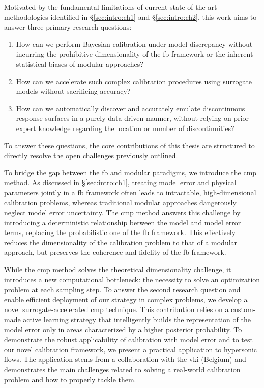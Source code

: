 Motivated by the fundamental limitations of current state-of-the-art methodologies identified in \S\ref{sec:intro:ch1} and \S\ref{sec:intro:ch2}, this work aims to answer three primary research questions:

\begin{enumerate}
  \item How can we perform Bayesian calibration under model discrepancy without incurring the prohibitive dimensionality of the \gls{fb} framework or the inherent statistical biases of modular approaches?
  \item How can we accelerate such complex calibration procedures using surrogate models without sacrificing accuracy?
  \item How can we automatically discover and accurately emulate discontinuous response surfaces in a purely data-driven manner, without relying on prior expert knowledge regarding the location or number of discontinuities?
\end{enumerate}

\smallskip
To answer these questions, the core contributions of this thesis are structured to directly resolve the open challenges previously outlined.

\smallskip
To bridge the gap between the \gls{fb} and modular paradigms, we introduce the \gls{cmp} method. As discussed in \S\ref{sec:intro:ch1}, treating model error and physical parameters jointly in a \gls{fb} framework often leads to intractable, high-dimensional calibration problems, whereas traditional modular approaches dangerously neglect model error uncertainty. The \gls{cmp} method answers this challenge by introducing a deterministic relationship between the model and model error terms, replacing the probabilistic one of the \gls{fb} framework. This effectively reduces the dimensionality of the calibration problem to that of a modular approach, but preserves the coherence and fidelity of the \gls{fb} framework.

\smallskip
While the \gls{cmp} method solves the theoretical dimensionality challenge, it introduces a new computational bottleneck: the necessity to solve an optimization problem at each sampling step. To answer the second research question and enable efficient deployment of our strategy in complex problems, we develop a novel surrogate-accelerated \gls{cmp} technique. This contribution relies on a custom-made active learning strategy that intelligently builds the representation of the model error only in areas characterized by a higher posterior probability. To demonstrate the robust applicability of calibration with model error and to test our novel calibration framework, we present a practical application to hypersonic flows. The application stems from a collaboration with the \gls{vki} (Belgium) and demonstrates the main challenges related to solving a real-world calibration problem and how to properly tackle them.

